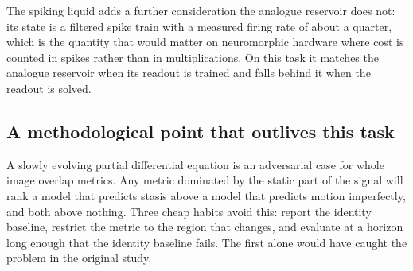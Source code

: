 The spiking liquid adds a further consideration the analogue reservoir does
not: its state is a filtered spike train with a measured firing rate of about a
quarter, which is the quantity that would matter on neuromorphic hardware where
cost is counted in spikes rather than in multiplications. On this task it
matches the analogue reservoir when its readout is trained and falls behind it
when the readout is solved.

\subsection{A methodological point that outlives this task}

A slowly evolving partial differential equation is an adversarial case for
whole image overlap metrics. Any metric dominated by the static part of the
signal will rank a model that predicts stasis above a model that predicts
motion imperfectly, and both above nothing. Three cheap habits avoid this:
report the identity baseline, restrict the metric to the region that changes,
and evaluate at a horizon long enough that the identity baseline fails. The
first alone would have caught the problem in the original study.
